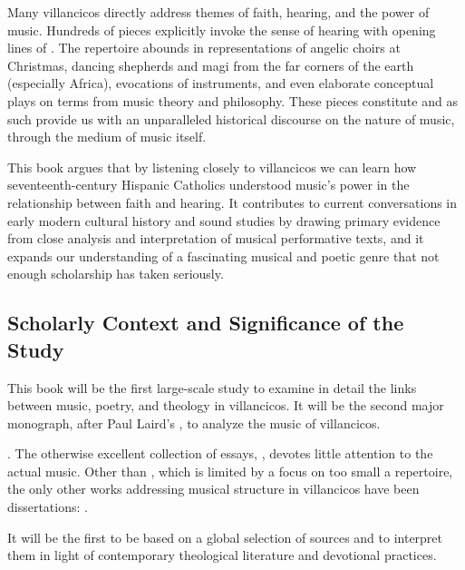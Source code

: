 \documentclass{vcbook-proposal}
\begin{document}
Many villancicos directly address themes of faith, hearing, and the power of 
music.
Hundreds of pieces explicitly invoke the sense of hearing with opening lines of 
  .
The repertoire abounds in representations of angelic choirs at Christmas, 
dancing shepherds and magi from the far corners of the earth (especially 
Africa), evocations of instruments, and even elaborate conceptual plays on 
terms from music theory and philosophy.
These pieces constitute  and as such provide us with 
an unparalleled historical discourse on the nature of music, through the medium 
of music itself.

This book argues that by listening closely to villancicos we can learn how
seventeenth-century Hispanic Catholics understood music's power in the
relationship between faith and hearing. 
It contributes to current conversations in early modern cultural history and
sound studies by drawing primary evidence from close analysis and interpretation
of musical performative texts, and it expands our understanding of a fascinating
musical and poetic genre that not enough scholarship has taken seriously.

\subsection{Scholarly Context and Significance of the Study}

This book will be the first large-scale study to examine in detail the links 
between music, poetry, and theology in villancicos.
It will be the second major monograph, after Paul Laird's , to analyze the music of villancicos.%
  \begin{Footnote}
      \Autocite{Laird:VC}. 
      The otherwise excellent collection of essays, 
      \autocite{Knighton-Torrente:VCs}, devotes little attention to the actual music.
      Other than \autocite{Rubio:Forma}, which is limited by a focus on too small a 
      repertoire, the only other works addressing musical structure in villancicos 
      have been dissertations: \autocites{CaberoPueyo:PhD}{Illari:Polychoral}.
  \end{Footnote}
It will be the first to be based on a global selection of sources and to 
interpret them in light of contemporary theological literature and devotional 
practices.
\end{document}
